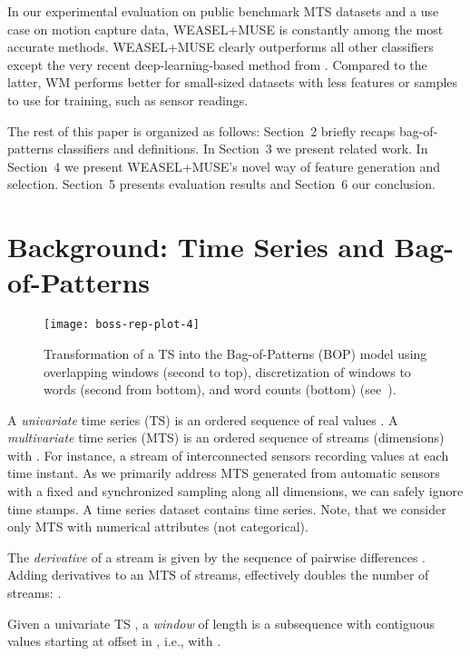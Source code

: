 \documentclass[sigconf]{acmart}
\begin{document}
In our experimental evaluation on  public benchmark MTS datasets and a use case on motion capture data, WEASEL+MUSE is constantly among the most accurate methods. 
WEASEL+MUSE clearly outperforms all other classifiers except the very recent deep-learning-based method from \cite{karim2018multivariate}. Compared to the latter, WM performs better for small-sized datasets with less features or samples to use for training, such as sensor readings.



The rest of this paper is organized as follows: Section~2 briefly recaps bag-of-patterns classifiers and definitions. In Section~3 we present related work. In Section~4 we present WEASEL+MUSE's novel way of feature generation and selection. Section~5 presents evaluation results and Section~6 our conclusion.


\section{Background: Time Series and Bag-of-Patterns}

\begin{figure}
	\begin{centering}
		\texttt{[image: boss-rep-plot-4]}
		\par\end{centering}
	\caption{Transformation of a TS into the Bag-of-Patterns (BOP) model using overlapping windows (second to top), discretization of windows to words (second from bottom), and word counts (bottom) (see~\cite{schaefer2017weasel}).\label{fig:transformation}}
\end{figure}

A \emph{univariate} time series (TS) 
is an ordered sequence of  real values . A \emph{multivariate} time series (MTS)  is an ordered sequence of  streams (dimensions) with . 
For instance, a stream of  interconnected sensors recording values at each time instant. As we primarily address MTS generated from automatic sensors with a fixed and synchronized sampling along all dimensions, we can safely ignore time stamps. A time series dataset  contains  time series. Note, that we consider only MTS with numerical attributes (not categorical).

The \emph{derivative} of a stream  is given by the sequence of pairwise differences . Adding derivatives to an MTS  of  streams, effectively doubles the number of streams: .

Given a univariate TS , a \emph{window}  of length  is a subsequence with  contiguous values starting at offset  in , i.e.,  with .
\end{document}
